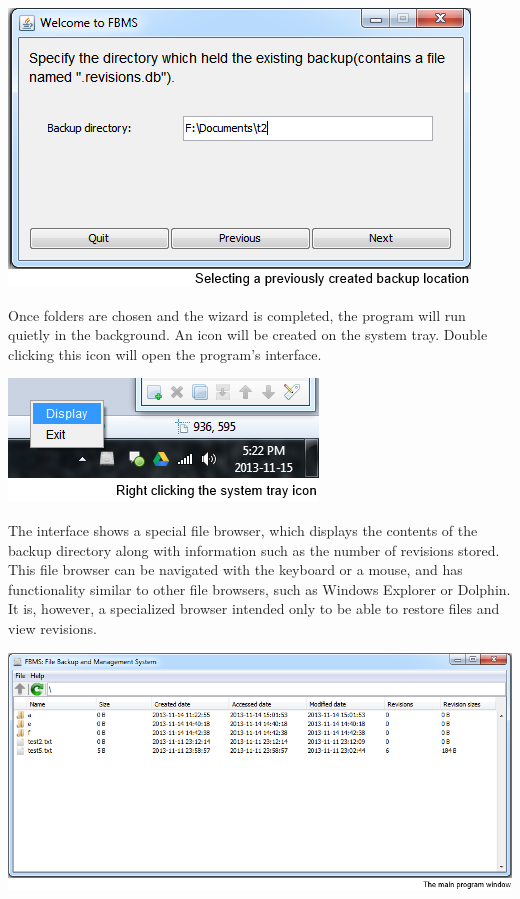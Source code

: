 \documentclass[12pt,a4paper]{article}
\begin{document}
\includegraphics{images/3-oldBackup.png}

Once folders are chosen and the wizard is completed, the program will run quietly in the background. An icon will be created on the system tray. Double clicking this icon will open the program's interface.

\includegraphics{images/4-systemTray.png}

The interface shows a special file browser, which displays the contents of the backup directory along with information such as the number of revisions stored. This file browser can be navigated with the keyboard or a mouse, and has functionality similar to other file browsers, such as Windows Explorer or Dolphin. It is, however, a specialized browser intended only to be able to restore files and view revisions.

\includegraphics[width=\textwidth]{images/5-mainWindow.png}
\end{document}

